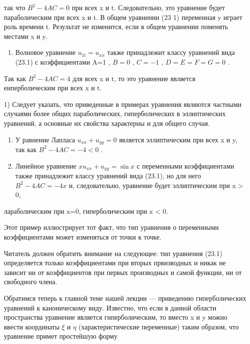 \documentclass[
  ukrainian,
]{article}
\providecommand{\tightlist}{%
  \setlength{\itemsep}{0pt}\setlength{\parskip}{0pt}}
\begin{document}
так что \(B^2-4AC=0\) при всех x и t. Следовательно, это уравнение будет
параболическим при всех x и t. В общем уравнении (23 1) переменная y
играет роль времени t. Результат не изменится, если в общем уравнении
поменять местами x и y.

\begin{enumerate}
\def\labelenumi{\arabic{enumi}.}
\setcounter{enumi}{1}
\tightlist
\item
  Волновое уравнение \(u_{1t} = u_{xx}\) также принадлежит классу
  уравнений вида (23.1) с коэффициентами A=1 , \(B=0\) , \(C=-1\) ,
  \(D=E=F=G=0\) .
\end{enumerate}

Так как \(B^2 - 4AC = 4\) для всех x и t, то это уравнение является
еиперболическим при всех x и t.

1) Следует указать, что приведенные в примерах уравнения являются
частными случаями более общих параболических, гиперболических в
эллиптических уравнений, а основные их свойства характерны и для общего
случая.

\begin{enumerate}
\def\labelenumi{\arabic{enumi}.}
\setcounter{enumi}{2}
\item
  У равнение Лапласа \(u_{xx} + u_{yy} = 0\) является эллиптическим при
  всех x и y, так как \(B^2 - 4AC = - 4 < 0\) .
\item
  Линейное уравнение \(xu_{xx} + u_{yy} = \sin x\) с переменными
  коэффициентами также принадлежит классу уравнений вида (23.1), но для
  него \(B^2-4AC=-4x\) и, следовательно, уравнение будет эллиптическим
  при x \textgreater{} 0,
\end{enumerate}

лараболическим при x=0, гиперболическим при x \textless{} 0.

Этот пример иллюстрирует тот факт, что тип уравнения о переменными
коэффициентами может изменяться от точки к точке.

Читатель должен обратить внимание на следующее: тип уравнения (23.1)
определяется только коэффициентами при вторых првизводных и никак не
зависит ни от коэффициентов при первых производных и самой функции, ни
от свободного члена.

Обратимся теперь к главной теме нашей лекции --- приведению
гиперболических уравнений к каноническому виду. Известно, что если в
данной области пространства уравнение является гиперболическим, то
вместо x и y можно ввести координаты \(\xi\) и \(\eta\)
(характеристические переменные) таким образом, что уравнение примет
простейшую форму
\end{document}
